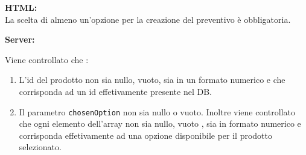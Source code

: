 \documentclass[a4paper, 12pt]{article}
\begin{document}
\noindent \textbf{HTML:} \\ La scelta di almeno un'opzione per la creazione del preventivo è obbligatoria.

\noindent \textbf{Server:} 

\noindent Viene controllato che :
\begin{enumerate}
\item L'id del prodotto non sia nullo, vuoto, sia in un formato numerico e che corrisponda ad un id effetivamente presente nel DB.
\item Il parametro \verb|chosenOption| non sia nullo o vuoto. Inoltre viene controllato che ogni elemento dell'array non sia nullo, vuoto , sia in formato numerico e corrisponda effetivamente ad una opzione
disponibile per il prodotto selezionato.
\end{enumerate}
\newpage
\end{document}
